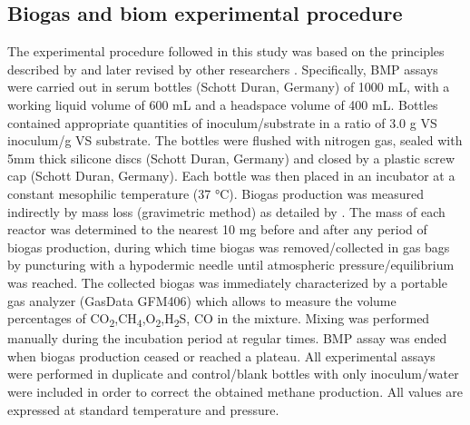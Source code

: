 \subsection{Biogas and biom experimental procedure}
The experimental procedure followed in this study was based on the principles described by \cite{Owen_1979} and later revised by other researchers \cite{Angelidaki_2009,Holliger_2016}. Specifically, BMP assays were carried out in serum bottles (Schott Duran, Germany) of 1000 mL, with a working liquid volume of 600 mL and a headspace volume of 400 mL. Bottles contained appropriate quantities of inoculum/substrate in a ratio of 3.0 g VS inoculum/g VS substrate. The bottles were flushed with nitrogen gas, sealed with 5mm thick silicone discs (Schott Duran, Germany) and closed by a plastic screw cap (Schott Duran, Germany). Each bottle was then placed in an incubator at a constant mesophilic temperature (37 °C). Biogas production was measured indirectly by mass loss (gravimetric method) as detailed by \cite{Hafner_2015}. The mass of each reactor was determined to the nearest 10 mg before and after any period of biogas production, during which time biogas was removed/collected in gas bags by puncturing with a hypodermic needle until atmospheric pressure/equilibrium was reached. The collected biogas was immediately characterized by a portable gas analyzer (GasData GFM406) which allows to measure the volume percentages of CO\textsubscript{2},CH\textsubscript{4},O\textsubscript{2},H\textsubscript{2}S, CO in the mixture. Mixing was performed manually during the incubation period at regular times. BMP assay was ended when biogas production ceased or reached a plateau. All experimental assays were performed in duplicate and control/blank bottles with only inoculum/water were included in order to correct the obtained methane production.  All values are expressed at standard temperature and pressure.
